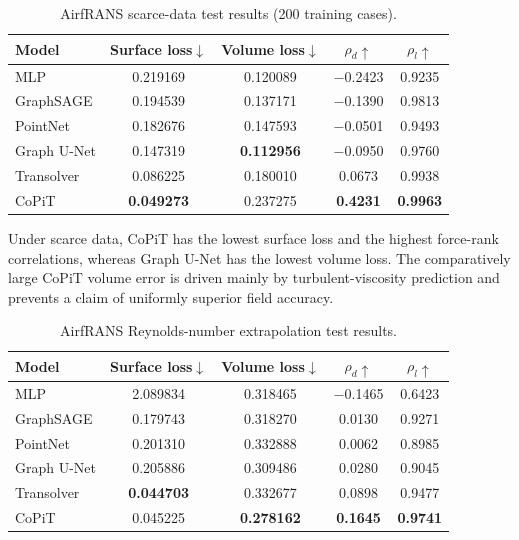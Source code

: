 \documentclass[final,3p,times]{elsarticle}
\begin{document}
\begin{table}[H]
\caption{AirfRANS scarce-data test results (200 training cases).}
\label{tab:scarce}
\centering\footnotesize
\begin{tabular}{@{}lcccc@{}}
\toprule
Model & Surface loss$\downarrow$ & Volume loss$\downarrow$ & $\rho_d\uparrow$ & $\rho_l\uparrow$ \\
\midrule
MLP         & 0.219169 & 0.120089 & $-$0.2423 & 0.9235 \\
GraphSAGE   & 0.194539 & 0.137171 & $-$0.1390 & 0.9813 \\
PointNet    & 0.182676 & 0.147593 & $-$0.0501 & 0.9493 \\
Graph U-Net & 0.147319 & \textbf{0.112956} & $-$0.0950 & 0.9760 \\
Transolver  & 0.086225 & 0.180010 & 0.0673 & 0.9938 \\
CoPiT       & \textbf{0.049273} & 0.237275 & \textbf{0.4231} & \textbf{0.9963} \\
\bottomrule
\end{tabular}
\end{table}

Under scarce data, CoPiT has the lowest surface loss and the highest force-rank correlations, whereas Graph U-Net has the lowest volume loss. The comparatively large CoPiT volume error is driven mainly by turbulent-viscosity prediction and prevents a claim of uniformly superior field accuracy.

\begin{table}[H]
\caption{AirfRANS Reynolds-number extrapolation test results.}
\label{tab:reynolds}
\centering\footnotesize
\begin{tabular}{@{}lcccc@{}}
\toprule
Model & Surface loss$\downarrow$ & Volume loss$\downarrow$ & $\rho_d\uparrow$ & $\rho_l\uparrow$ \\
\midrule
MLP         & 2.089834 & 0.318465 & $-$0.1465 & 0.6423 \\
GraphSAGE   & 0.179743 & 0.318270 & 0.0130 & 0.9271 \\
PointNet    & 0.201310 & 0.332888 & 0.0062 & 0.8985 \\
Graph U-Net & 0.205886 & 0.309486 & 0.0280 & 0.9045 \\
Transolver  & \textbf{0.044703} & 0.332677 & 0.0898 & 0.9477 \\
CoPiT       & 0.045225 & \textbf{0.278162} & \textbf{0.1645} & \textbf{0.9741} \\
\bottomrule
\end{tabular}
\end{table}
\end{document}
